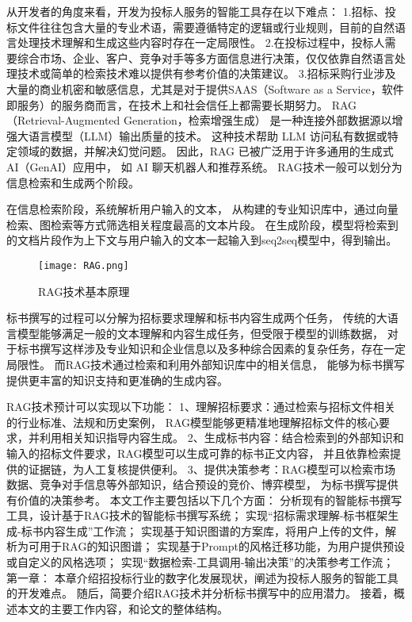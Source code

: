 \documentclass{xmu}
\begin{document}
从开发者的角度来看，开发为投标人服务的智能工具存在以下难点：
1.招标、投标文件往往包含大量的专业术语，需要遵循特定的逻辑或行业规则，目前的自然语言处理技术理解和生成这些内容时存在一定局限性。
2.在投标过程中，投标人需要综合市场、企业、客户、竞争对手等多方面信息进行决策，仅仅依靠自然语言处理技术或简单的检索技术难以提供有参考价值的决策建议。
3.招标采购行业涉及大量的商业机密和敏感信息，尤其是对于提供SAAS（Software as a Service，软件即服务）的服务商而言，在技术上和社会信任上都需要长期努力。
RAG（Retrieval-Augmented Generation，检索增强生成）
是一种连接外部数据源以增强大语言模型（LLM）输出质量的技术。
这种技术帮助 LLM 访问私有数据或特定领域的数据，并解决幻觉问题。
因此，RAG 已被广泛用于许多通用的生成式 AI（GenAI）应用中，
如 AI 聊天机器人和推荐系统。
RAG技术一般可以划分为信息检索和生成两个阶段。

在信息检索阶段，系统解析用户输入的文本，
从构建的专业知识库中，通过向量检索、图检索等方式筛选相关程度最高的文本片段。
在生成阶段，模型将检索到的文档片段作为上下文与用户输入的文本一起输入到seq2seq模型中，得到输出。

\begin{figure}[!htb]
    \centering
    \texttt{[image: RAG.png]}\\
    \caption{RAG技术基本原理}\label{ragyuanli}
\end{figure}
标书撰写的过程可以分解为招标要求理解和标书内容生成两个任务，
传统的大语言模型能够满足一般的文本理解和内容生成任务，但受限于模型的训练数据，
对于标书撰写这样涉及专业知识和企业信息以及多种综合因素的复杂任务，存在一定局限性。
而RAG技术通过检索和利用外部知识库中的相关信息，
能够为标书撰写提供更丰富的知识支持和更准确的生成内容。

RAG技术预计可以实现以下功能：
1、理解招标要求：通过检索与招标文件相关的行业标准、法规和历史案例，
RAG模型能够更精准地理解招标文件的核心要求，并利用相关知识指导内容生成。
2、生成标书内容：结合检索到的外部知识和输入的招标文件要求，RAG模型可以生成可靠的标书正文内容，
并且依靠检索提供的证据链，为人工复核提供便利。
3、提供决策参考：RAG模型可以检索市场数据、竞争对手信息等外部知识，结合预设的竞价、博弈模型，
为标书撰写提供有价值的决策参考。
本文工作主要包括以下几个方面：
分析现有的智能标书撰写工具，设计基于RAG技术的智能标书撰写系统；
实现“招标需求理解-标书框架生成-标书内容生成”工作流；
实现基于知识图谱的方案库，将用户上传的文件，解析为可用于RAG的知识图谱；
实现基于Prompt的风格迁移功能，为用户提供预设或自定义的风格选项；
实现“数据检索-工具调用-输出决策”的决策参考工作流；
第一章：
本章介绍招投标行业的数字化发展现状，阐述为投标人服务的智能工具的开发难点。
随后，简要介绍RAG技术并分析标书撰写中的应用潜力。
接着，概述本文的主要工作内容，和论文的整体结构。
\end{document}

